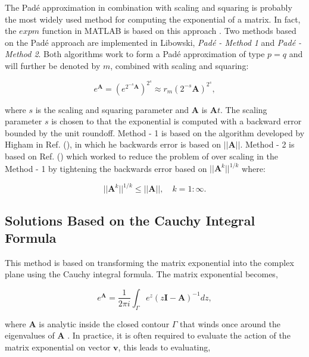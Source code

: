 The Pad\'e approximation in combination with scaling and squaring is probably the most widely used method for computing the exponential of a matrix. In fact, the $expm$ function in MATLAB is based on this approach \cite{higham2009}. Two methods based on the Pad\'e approach are implemented in Libowski, \textit{Pad\'e - Method 1} and \textit{Pad\'e - Method 2}. Both algorithms work to form a Pad\'e approximation of type $p = q$ and will further be denoted by $m$, combined with scaling and squaring:

\begin{equation}
    e^{\boldsymbol{A}} = (e^{2^{-s}\boldsymbol{A}})^{2^{s}} \approx r_{m}(2^{-s}\boldsymbol{A})^{2^{s}},
\end{equation}

\noindent where $s$ is the scaling and squaring parameter and $\boldsymbol{A}$ is $\boldsymbol{A}t$. The scaling parameter $s$ is chosen to that the exponential is computed with a backward error bounded by the unit roundoff.  Method - 1 is based on the algorithm developed by Higham in Ref. (\cite{higham2005}), in which he backwards error is based on $||\boldsymbol{A}||$. Method - 2 is based on Ref. (\cite{higham2009}) which worked to reduce the problem of over scaling in the Method - 1 by tightening the backwards error based on $||\boldsymbol{A}^{k}||^{1/k}$ where:

\begin{equation}
    ||\boldsymbol{A}^{k}||^{1/k} \leq ||\boldsymbol{A}||, \quad k = 1:\infty.
\end{equation}


\subsection{Solutions Based on the Cauchy Integral Formula}
This method is based on transforming the matrix exponential into the complex plane using the Cauchy integral formula.  The matrix exponential becomes,

\begin{equation}
	e^{\boldsymbol{A}} = \frac{1}{2\pi i}\int_{\Gamma} e^{z}(z\boldsymbol{I} - \boldsymbol{A})^{-1}dz,
	\label{eq:cauchyExp}
\end{equation}

\noindent where $\boldsymbol{A}$ is analytic inside the closed contour $\Gamma$ that winds once around the eigenvalues of $\boldsymbol{A}$ \cite{pusaThesis} \cite{pusa2011} \cite{Trefethen2006}. In practice, it is often required to evaluate the action of the matrix exponential on vector $\boldsymbol{v}$, this leads to evaluating,

